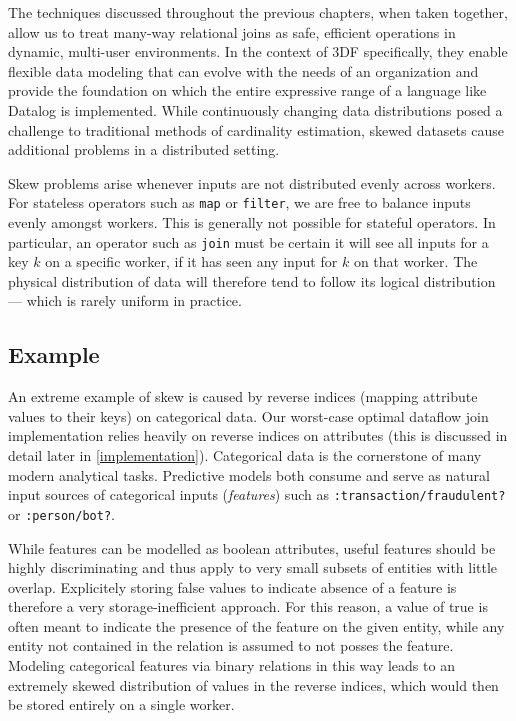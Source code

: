 \documentclass[../catalog.tex]{subfiles}
\begin{document}
The techniques discussed throughout the previous chapters, when taken
together, allow us to treat many-way relational joins as safe,
efficient operations in dynamic, multi-user environments. In the
context of 3DF specifically, they enable flexible data modeling that
can evolve with the needs of an organization and provide the
foundation on which the entire expressive range of a language like
Datalog is implemented. While continuously changing data distributions
posed a challenge to traditional methods of cardinality estimation,
skewed datasets cause additional problems in a distributed setting.

Skew problems arise whenever inputs are not distributed evenly across
workers. For stateless operators such as \texttt{map} or
\texttt{filter}, we are free to balance inputs evenly amongst
workers. This is generally not possible for stateful operators. In
particular, an operator such as \texttt{join} must be certain it will
see all inputs for a key $k$ on a specific worker, if it has seen any
input for $k$ on that worker. The physical distribution of data will
therefore tend to follow its logical distribution — which is rarely
uniform in practice.

\subsection{Example}

An extreme example of skew is caused by reverse indices (mapping
attribute values to their keys) on categorical data. Our worst-case
optimal dataflow join implementation relies heavily on reverse indices
on attributes (this is discussed in detail later in
\autoref{implementation}). Categorical data is the cornerstone of many
modern analytical tasks. Predictive models both consume and serve as
natural input sources of categorical inputs (\emph{features}) such as
\texttt{:transaction/fraudulent?} or \texttt{:person/bot?}.

While features can be modelled as boolean attributes, useful features
should be highly discriminating and thus apply to very small subsets
of entities with little overlap. Explicitely storing false values to
indicate absence of a feature is therefore a very storage-inefficient
approach. For this reason, a value of true is often meant to indicate
the presence of the feature on the given entity, while any entity not
contained in the relation is assumed to not posses the
feature. Modeling categorical features via binary relations in this
way leads to an extremely skewed distribution of values in the reverse
indices, which would then be stored entirely on a single worker.
\end{document}
